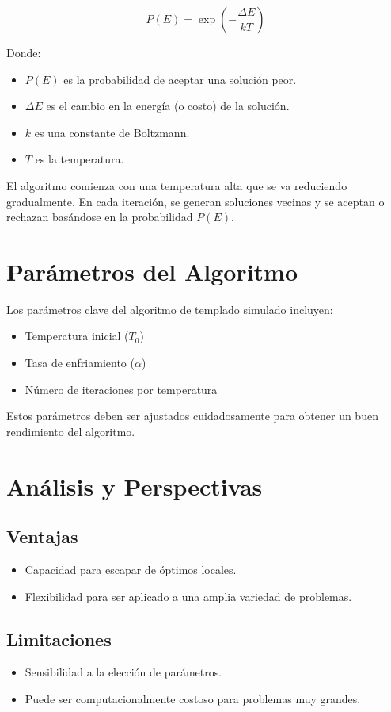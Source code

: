 \documentclass{article}
\begin{document}
\begin{equation}
P(E) = \exp\left(-\frac{\Delta E}{kT}\right)
\end{equation}

Donde:
\begin{itemize}
    \item \( P(E) \) es la probabilidad de aceptar una solución peor.
    \item \( \Delta E \) es el cambio en la energía (o costo) de la solución.
    \item \( k \) es una constante de Boltzmann.
    \item \( T \) es la temperatura.
\end{itemize}

El algoritmo comienza con una temperatura alta que se va reduciendo gradualmente. En cada iteración, se generan soluciones vecinas y se aceptan o rechazan basándose en la probabilidad \( P(E) \).

\section{Parámetros del Algoritmo}
Los parámetros clave del algoritmo de templado simulado incluyen:
\begin{itemize}
    \item Temperatura inicial (\( T_0 \))
    \item Tasa de enfriamiento (\( \alpha \))
    \item Número de iteraciones por temperatura
\end{itemize}

Estos parámetros deben ser ajustados cuidadosamente para obtener un buen rendimiento del algoritmo.

\section{Análisis y Perspectivas}
\subsection{Ventajas}
\begin{itemize}
    \item Capacidad para escapar de óptimos locales.
    \item Flexibilidad para ser aplicado a una amplia variedad de problemas.
\end{itemize}

\subsection{Limitaciones}
\begin{itemize}
    \item Sensibilidad a la elección de parámetros.
    \item Puede ser computacionalmente costoso para problemas muy grandes.
\end{itemize}
\end{document}
